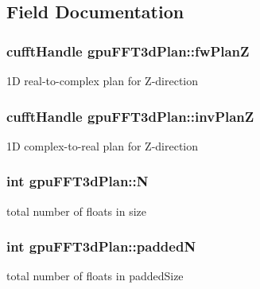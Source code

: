 \subsection{Field Documentation}
\hypertarget{structgpuFFT3dPlan_a064f70e01a88af56749d1503be7e15e2}{
\subsubsection[{fwPlanZ}]{\setlength{\rightskip}{0pt plus 5cm}cufftHandle {\bf gpuFFT3dPlan::fwPlanZ}}}
\label{structgpuFFT3dPlan_a064f70e01a88af56749d1503be7e15e2}


1D real-\/to-\/complex plan for Z-\/direction 

\hypertarget{structgpuFFT3dPlan_abdfef776f10427496514c746f14eb67e}{
\subsubsection[{invPlanZ}]{\setlength{\rightskip}{0pt plus 5cm}cufftHandle {\bf gpuFFT3dPlan::invPlanZ}}}
\label{structgpuFFT3dPlan_abdfef776f10427496514c746f14eb67e}


1D complex-\/to-\/real plan for Z-\/direction 

\hypertarget{structgpuFFT3dPlan_ab66a607bcdf3058d52d2ee6cb9c679d8}{
\subsubsection[{N}]{\setlength{\rightskip}{0pt plus 5cm}int {\bf gpuFFT3dPlan::N}}}
\label{structgpuFFT3dPlan_ab66a607bcdf3058d52d2ee6cb9c679d8}


total number of floats in size 

\hypertarget{structgpuFFT3dPlan_a62288e1f5c4dc34b3141e811dbe209a6}{
\subsubsection[{paddedN}]{\setlength{\rightskip}{0pt plus 5cm}int {\bf gpuFFT3dPlan::paddedN}}}
\label{structgpuFFT3dPlan_a62288e1f5c4dc34b3141e811dbe209a6}


total number of floats in paddedSize 

